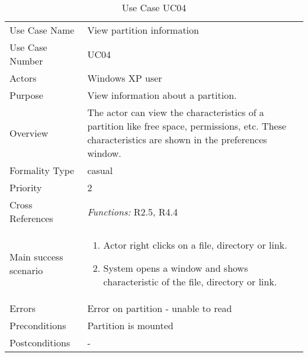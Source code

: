 \begin{longtable}{|p{4cm} X|}
\caption{\label{tab:useCase04}Use Case UC04}\\
\hline
Use Case Name 					&View partition information\\
Use Case Number					&UC04\\
Actors							&Windows XP user\\
Purpose							&View information about a partition.\\
Overview						&The actor can view the characteristics of a partition like free space, permissions, etc. These characteristics are shown in the preferences window.\\
Formality Type							&casual\\
Priority						&2\\
Cross References				&\textit{Functions:} R2.5, R4.4\\ 
Main success scenario				&
\begin{enumerate}
\item Actor right clicks on a file, directory or link.
\item System opens a window and shows characteristic of the file, directory or link.
\end{enumerate}
\\
Errors							&Error on partition - unable to read\\
Preconditions					&Partition is mounted\\
Postconditions					&-\\
\hline
\end{longtable}
